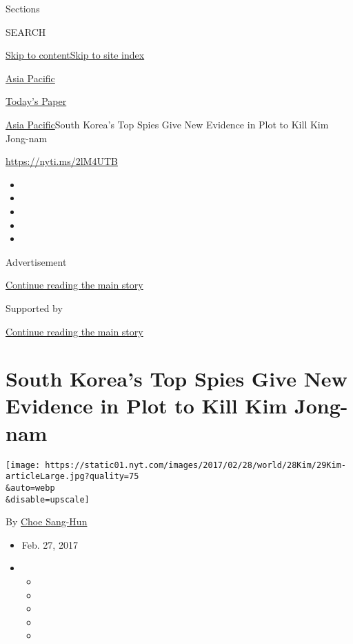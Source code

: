 Sections

SEARCH

\protect\hyperlink{site-content}{Skip to
content}\protect\hyperlink{site-index}{Skip to site index}

\href{https://www.nytimes.com/section/world/asia}{Asia Pacific}

\href{https://myaccount.nytimes.com/auth/login?response_type=cookie\&client_id=vi}{}

\href{https://www.nytimes.com/section/todayspaper}{Today's Paper}

\href{/section/world/asia}{Asia Pacific}\textbar{}South Korea's Top
Spies Give New Evidence in Plot to Kill Kim Jong-nam

\url{https://nyti.ms/2lM4UTB}

\begin{itemize}
\item
\item
\item
\item
\item
\end{itemize}

Advertisement

\protect\hyperlink{after-top}{Continue reading the main story}

Supported by

\protect\hyperlink{after-sponsor}{Continue reading the main story}

\hypertarget{south-koreas-top-spies-give-new-evidence-in-plot-to-kill-kim-jong-nam}{%
\section{South Korea's Top Spies Give New Evidence in Plot to Kill Kim
Jong-nam}\label{south-koreas-top-spies-give-new-evidence-in-plot-to-kill-kim-jong-nam}}

\texttt{[image: https://static01.nyt.com/images/2017/02/28/world/28Kim/29Kim-articleLarge.jpg?quality=75\\\&auto=webp\\\&disable=upscale]}

By \href{http://www.nytimes.com/by/choe-sang-hun}{Choe Sang-Hun}

\begin{itemize}
\item
  Feb. 27, 2017
\item
  \begin{itemize}
  \item
  \item
  \item
  \item
  \item
  \end{itemize}
\end{itemize}

